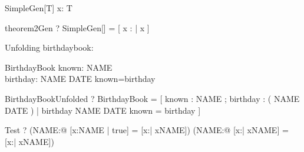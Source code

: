 \begin{schema}{SimpleGen}[T]
  x: T
\end{schema}

\begin{theorem}{theorem2Gen}
  \vdash? SimpleGen[\nat] =
    [ x : \arithmos | x \in \nat ]
\end{theorem}




Unfolding birthdaybook:

\begin{zed}\end{zed}

\begin{schema}{BirthdayBook}
    known: \power NAME \\
    birthday: NAME \pfun DATE
\where
    known=\dom birthday
\end{schema}

\begin{theorem}{BirthdayBookUnfolded}
  \vdash? BirthdayBook =
    [ known : \power NAME ; birthday : \power ( NAME \cross DATE )
    | birthday \in NAME \pfun DATE \land known = \dom birthday ]
\end{theorem}

\begin{theorem}{Test}
  \vdash? (\exists NAME:\power\arithmos @ [x:NAME | true] =
                                          [x:\arithmos | x\in NAME])
          \iff
          (\exists NAME:\power\arithmos @ [x:\arithmos | x\in NAME] =
                                          [x:\arithmos | x\in NAME])
\end{theorem}
